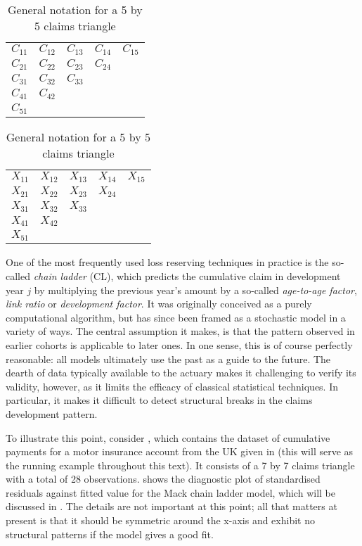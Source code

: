 \documentclass[a4paper]{book}
\begin{document}
\begin{table}
  \centering
  \begin{subtable}{0.45\textwidth}
    \centering
    \large
    \begin{tabular}{c c c c c}
      $C_{11}$ & $C_{12}$ & $C_{13}$ & $C_{14}$ & $C_{15}$ \\
      $C_{21}$ & $C_{22}$ & $C_{23}$ & $C_{24}$ & \\
      $C_{31}$ & $C_{32}$ & $C_{33}$ &  &  \\
      $C_{41}$ & $C_{42}$ &  &  & \\
      $C_{51}$ &  &  &  & 
    \end{tabular}
  \end{subtable}
  \begin{subtable}{0.45\textwidth}
    \centering
    \large
    \begin{tabular}{c c c c c}
      $X_{11}$ & $X_{12}$ & $X_{13}$ & $X_{14}$ & $X_{15}$ \\
      $X_{21}$ & $X_{22}$ & $X_{23}$ & $X_{24}$ & \\
      $X_{31}$ & $X_{32}$ & $X_{33}$ &  &  \\
      $X_{41}$ & $X_{42}$ &  &  & \\
      $X_{51}$ &  &  &  & 
    \end{tabular}
  \end{subtable}
  \caption{General notation for a 5 by 5 claims triangle}
\end{table}

One of the most frequently used loss reserving techniques in practice is the so-called \emph{chain ladder} (CL), which predicts the cumulative claim in development year $j$ by multiplying the previous year's amount by a so-called \emph{age-to-age factor}, \emph{link ratio} or \emph{development factor}. It was originally conceived as a purely computational algorithm, but has since been framed as a stochastic model in a variety of ways. The central assumption it makes, is that the pattern observed in earlier cohorts is applicable to later ones. In one sense, this is of course perfectly reasonable: all models ultimately use the past as a guide to the future. The dearth of data typically available to the actuary makes it challenging to verify its validity, however, as it limits the efficacy of classical statistical techniques. In particular, it makes it difficult to detect structural breaks in the claims development pattern. 

To illustrate this point, consider , which contains the dataset of cumulative payments for a motor insurance account from the UK given in \cite{christofides} (this will serve as the running example throughout this text). It consists of a 7 by 7 claims triangle with a total of 28 observations.  shows the diagnostic plot of standardised residuals against fitted value for the Mack chain ladder model, which will be discussed in . The details are not important at this point; all that matters at present is that it should be symmetric around the x-axis and exhibit no structural patterns if the model gives a good fit. 
\end{document}
